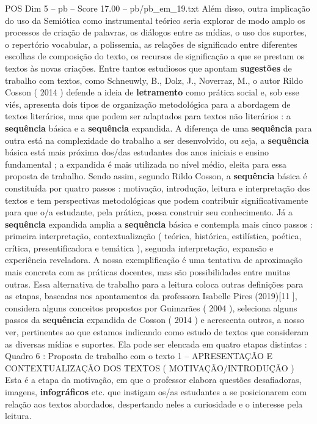 \begin{textsample}{POS Dim 5 – pb – Score 17.00 – pb/pb\_em\_19.txt}
Além disso, outra implicação do uso da Semiótica como instrumental teórico seria explorar de modo amplo os processos de criação de palavras, os diálogos entre as mídias, o uso dos suportes, o repertório vocabular, a polissemia, as relações de significado entre diferentes escolhas de composição do texto, os recursos de significação a que se prestam os textos às novas criações.
Entre tantos estudiosos que apontam \textbf{sugestões} de trabalho com textos, como Schneuwly, B., Dolz, J., Noverraz, M., o autor Rildo Cosson ( 2014 ) defende a ideia de \textbf{letramento} como prática social e, sob esse viés, apresenta dois tipos de organização metodológica para a abordagem de textos literários, mas que podem ser adaptados para textos não literários : a \textbf{sequência} básica e a \textbf{sequência} expandida.
A diferença de uma \textbf{sequência} para outra está na complexidade do trabalho a ser desenvolvido, ou seja, a \textbf{sequência} básica está mais próxima dos/das estudantes dos anos iniciais e ensino fundamental ; a expandida é mais utilizada no nível médio, eleita para essa proposta de trabalho.
Sendo assim, segundo Rildo Cosson, a \textbf{sequência} básica é constituída por quatro passos : motivação, introdução, leitura e interpretação dos textos e tem perspectivas metodológicas que podem contribuir significativamente para que o/a estudante, pela prática, possa construir seu conhecimento.
Já a \textbf{sequência} expandida amplia a \textbf{sequência} básica e contempla mais cinco passos : primeira interpretação, contextualização ( teórica, histórica, estilística, poética, crítica, presentificadora e temática ), segunda interpretação, expansão e experiência reveladora.
A nossa exemplificação é uma tentativa de aproximação mais concreta com as práticas docentes, mas são possibilidades entre muitas outras.
Essa alternativa de trabalho para a leitura coloca outras definições para as etapas, baseadas nos apontamentos da professora Isabelle Pires (2019)[11 ], considera alguns conceitos propostos por Guimarães ( 2004 ), seleciona alguns passos da \textbf{sequência} expandida de Cosson ( 2014 ) e acrescenta outros, a nosso ver, pertinentes ao que estamos indicando como estudo de textos que consideram as diversas mídias e suportes.
Ela pode ser elencada em quatro etapas distintas : Quadro 6 : Proposta de trabalho com o texto 1 – APRESENTAÇÃO E CONTEXTUALIZAÇÃO DOS TEXTOS ( MOTIVAÇÃO/INTRODUÇÃO ) Esta é a etapa da motivação, em que o professor elabora questões desafiadoras, imagens, \textbf{infográficos} etc. que instigam os/as estudantes a se posicionarem com relação aos textos abordados, despertando neles a curiosidade e o interesse pela leitura.

\end{textsample}

